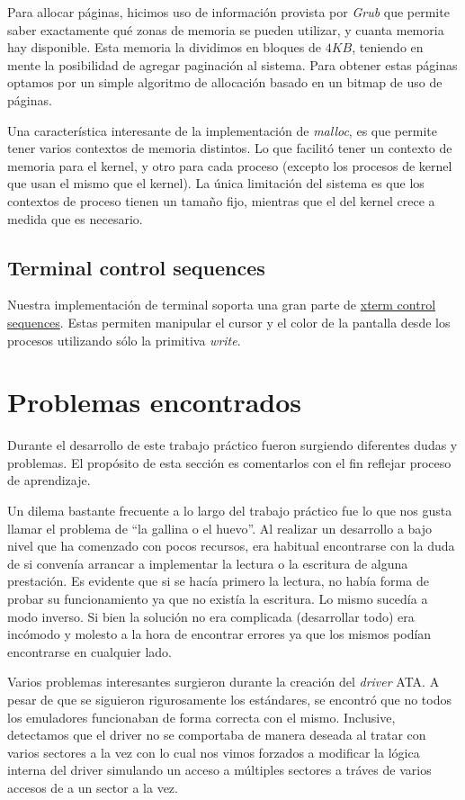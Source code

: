 \documentclass[a4paper,10pt]{article}
\begin{document}
Para allocar páginas, hicimos uso de información provista por \textit{Grub} que permite saber exactamente qué zonas de memoria se pueden utilizar, 
y cuanta memoria hay disponible.
Esta memoria la dividimos en bloques de $4KB$, teniendo en mente la posibilidad de agregar paginación al sistema.
Para obtener estas páginas optamos por un simple algoritmo de allocación basado en un bitmap de uso de páginas.

Una característica interesante de la implementación de \textit{malloc}, es que permite tener varios contextos de memoria distintos.
Lo que facilitó tener un contexto de memoria para el kernel, y otro para cada proceso (excepto los procesos de kernel que usan el mismo que el kernel).
La única limitación del sistema es que los contextos de proceso tienen un tamaño fijo, mientras que el del kernel crece a medida que es necesario.

\subsection{Terminal control sequences}
Nuestra implementación de terminal soporta una gran parte de \href{http://invisible-island.net/xterm/ctlseqs/ctlseqs.html}{xterm control sequences}.
Estas permiten manipular el cursor y el color de la pantalla desde los procesos utilizando sólo la primitiva \textit{write}.

\newpage
\section{Problemas encontrados}

Durante el desarrollo de este trabajo práctico fueron surgiendo diferentes dudas y problemas. El propósito de esta
sección es comentarlos con el fin reflejar proceso de aprendizaje.

Un dilema bastante frecuente a lo largo del trabajo práctico fue lo que nos gusta llamar el problema de ``la gallina o el huevo''. Al realizar
un desarrollo a bajo nivel que ha comenzado con pocos recursos, era habitual encontrarse con la duda de si convenía
arrancar a implementar la lectura o la escritura de alguna prestación. Es evidente que si se hacía primero la lectura, 
no había forma de probar su funcionamiento ya que no existía la escritura. Lo mismo sucedía a modo inverso. Si bien 
la solución no era complicada (desarrollar todo) era incómodo y molesto a la hora de encontrar errores ya que los mismos
podían encontrarse en cualquier lado.

Varios problemas interesantes surgieron durante la creación del \textit{driver} ATA. A pesar de que se siguieron
rigurosamente los estándares, se encontró que no todos los emuladores funcionaban de forma correcta con el mismo.
Inclusive, detectamos que el driver no se comportaba de manera deseada al tratar con varios sectores a la vez con lo
cual nos vimos forzados a modificar la lógica interna del driver simulando un acceso a múltiples sectores a tráves de
varios accesos de a un sector a la vez.
\end{document}

